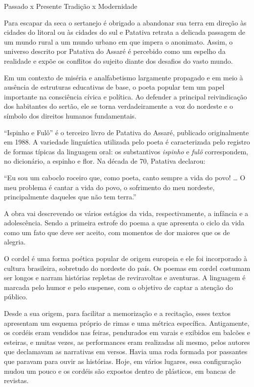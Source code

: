 \documentclass[12pt]{extarticle}
\begin{document}
Passado x Presente
Tradição x Modernidade

Para escapar da seca o sertanejo é obrigado a abandonar sua terra em 
direção às cidades do litoral ou às cidades do sul e Patativa retrata a 
delicada passagem de um mundo rural a um mundo urbano em que impera o 
anonimato. Assim, o universo descrito por Patativa do Assaré é percebido 
como um espelho da realidade e expõe os conflitos do sujeito diante dos 
desafios do vasto mundo. 

Em um contexto de miséria e analfabetismo largamente propagado e em meio 
à ausência de estruturas educativas de base, o poeta popular tem um 
papel importante na consciência cívica e política. Ao defender a principal 
reivindicação dos habitantes do sertão, ele se torna verdadeiramente a 
voz do nordeste e o símbolo dos direitos humanos fundamentais.

``Ispinho e Fulô'' é o terceiro livro de Patativa do Assaré, publicado 
originalmente em 1988. A variedade linguística utilizada pelo poeta é 
caracterizada pelo registro de formas típicas da linguagem oral: os 
substantivos \textit{ispinho} e \textit{fulô} correspondem, no dicionário, 
a espinho e flor. Na década de 70, Patativa declarou:

``Eu sou um caboclo roceiro que, como poeta, canto sempre a vida do povo! 
{}\ldots{} O meu problema é cantar a vida do povo, o sofrimento do meu 
nordeste, principalmente daqueles que não tem terra.''
 
A obra vai descrevendo os vários estágios da vida, respectivamente, a 
infância e a adolescência. Sendo a primeira estrofe do poema a que 
apresenta o ciclo da vida como um fato que deve ser aceito, com momentos 
de dor maiores que os de alegria.

O cordel é uma forma poética popular de origem europeia e ele foi 
incorporado à cultura brasileira, sobretudo do nordeste do país. 
Os poemas em cordel costumam ser longos e narram histórias repletas de 
reviravoltas e aventuras. A linguagem é marcada pelo humor e pelo 
suspense, com o objetivo de captar a atenção do público. 
 
Desde a sua origem, para facilitar a memorização e a recitação, esses 
textos apresentam um esquema próprio de rimas e uma métrica específica. 
Antigamente, os cordéis eram vendidos nas feiras, pendurados em varais e 
exibidos em balcões e esteiras, e muitas vezes, as performances eram 
realizadas ali mesmo, pelos autores que declamavam as narrativas em versos. 
Havia uma roda formada por passantes que paravam para ouvir as histórias. 
Hoje, em vários lugares, essa configuração mudou um pouco e os cordéis 
são expostos dentro de plásticos, em bancas de revistas.
 
\end{document}
